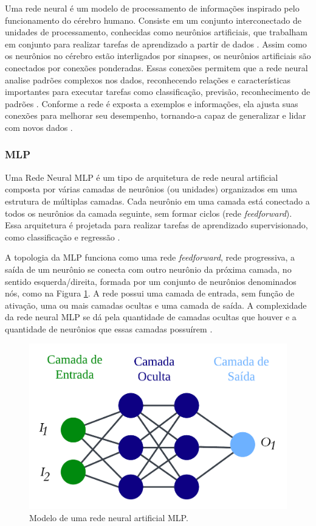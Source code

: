  Uma rede neural é um modelo de processamento de informações inspirado pelo funcionamento do cérebro humano. Consiste em um conjunto interconectado de unidades de processamento, conhecidas como neurônios artificiais, que trabalham em conjunto para realizar tarefas de aprendizado a partir de dados \cite{XIANG2018874}. Assim como os neurônios no cérebro estão interligados por sinapses, os neurônios artificiais são conectados por conexões ponderadas. Essas conexões permitem que a rede neural analise padrões complexos nos dados, reconhecendo relações e características importantes para executar tarefas como classificação, previsão, reconhecimento de padrões \cite{BABU201427}. Conforme a rede é exposta a exemplos e informações, ela ajusta suas conexões para melhorar seu desempenho, tornando-a capaz de generalizar e lidar com novos dados \cite{RAO2020107851}.

\subsubsection{MLP}
 
Uma Rede Neural MLP é um tipo de arquitetura de rede neural artificial composta por várias camadas de neurônios (ou unidades) organizados em uma estrutura de múltiplas camadas. Cada neurônio em uma camada está conectado a todos os neurônios da camada seguinte, sem formar ciclos (rede \textit{feedforward}). Essa arquitetura é projetada para realizar tarefas de aprendizado supervisionado, como classificação e regressão \cite{QIN2023543}.

 A topologia da MLP funciona como uma rede \textit{feedforward}, rede progressiva, a saída de um neurônio se conecta com outro neurônio da próxima camada, no sentido esquerda/direita, formada por um conjunto de neurônios denominados nós, como  na Figura \ref{fig:ann}. A rede possui uma camada de entrada, sem função de ativação, uma ou mais camadas ocultas e uma camada de saída. A complexidade da rede neural MLP se dá pela quantidade de camadas ocultas que houver e a quantidade de neurônios que essas camadas possuírem \cite{Grubler2018}.
 
 \begin{figure}[!htb]
 	\centering
 	\caption{Modelo de uma rede neural artificial MLP.}
 	\includegraphics[width=0.5\linewidth]{Modelos/Figuras/ann.pdf}
 	
 	\label{fig:ann}
  \end{figure}
 
